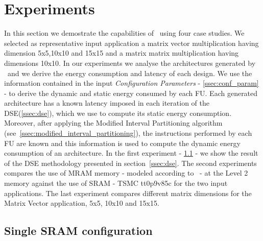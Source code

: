 \section{Experiments}
In this section we demostrate the capabilities of \frameworkname~using four case studies. We selected as representative input application a matrix vector multiplication having dimension 5x5,10x10 and 15x15 and a matrix matrix multiplication having dimensions 10x10.
In our experiments we analyse the architectures generated by \frameworkname~and we derive the energy consumption and latency of each design. We use the information contained in the input \textit{Configuration Parameters} - \ref{ssec:conf_param} - to derive the dynamic and static energy consumed by each FU. Each generated architecture has a known latency imposed in each iteration of the DSE(\ref{ssec:dse}), which we use to compute its static energy consumption. Moreover, after applying the Modified Interval Partitioning algorithm (see~\ref{ssec:modified_interval_partitioning}), the instructions performed by each FU are known and this information is used to compute the dynamic energy consumption of an architecture.
In the first experiment - \ref{ssec:exp_single} - we show the result of the DSE methodology presented in section~\ref{ssec:dse}. The second experiments compares the use of MRAM memory - modeled according to~\cite{8310393} - at the Level 2 memory against the use of SRAM - TSMC tt0p9v85c for the two input applications. The last experiment compares different matrix dimensions for the Matrix Vector application, 5x5, 10x10 and 15x15.


\subsection{Single SRAM configuration}
\label{ssec:exp_single}

